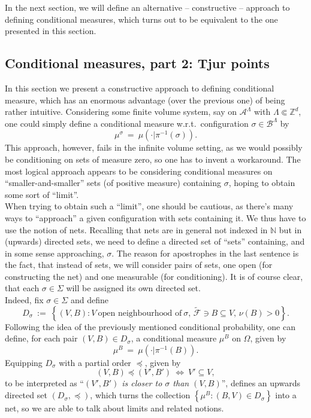 \documentclass[12pt]{article}
\newcommand{\A}{\mathcal{A}}
\newcommand{\B}{\mathcal{B}}
\newcommand{\F}{\mathcal{F}}
\newcommand{\N}{\mathbb{N}}
\newcommand{\Z}{\mathbb{Z}}
\newcommand{\set}[1]{\left\{#1\right\}}
\newcommand{\pika}{\boldsymbol{\cdot}}
\newcommand{\1}{\mathbbm{1}}
\newcommand{\5}{\vspace{0.5cm}}
\renewcommand{\tilde}{\widetilde}
\theoremstyle{definition}
\begin{document}
In the next section, we will define an alternative -- constructive -- approach to defining conditional measures, which turns out to be equivalent to the one presented in this section.


\subsection{Conditional measures, part 2: Tjur points}

In this section we present a constructive approach to defining conditional measure, which has an enormous advantage (over the previous one) of being rather intuitive. Considering some finite volume system, say on $\A^\Lambda$ with $\Lambda\Subset\Z^d$, one could simply define a conditional measure w.r.t.~configuration $\sigma\in\B^\Lambda$ by
$$\mu^\sigma ~=~ \mu(\pika|\pi^{-1}(\sigma)).$$
This approach, however, fails in the infinite volume setting, as we would possibly be conditioning on sets of measure zero, so one has to invent a workaround. The most logical approach appears to be considering conditional measures on ``smaller-and-smaller'' sets (of positive measure) containing $\sigma$, hoping to obtain some sort of ``limit''. \\

When trying to obtain such a ``limit'', one should be cautious, as there's many ways to ``approach'' a given configuration with sets containing it. We thus have to use the notion of nets. Recalling that nets are in general not indexed in $\N$ but in (upwards) directed sets, we need to define a directed set of ``sets'' containing, and in some sense approaching, $\sigma$. The reason for apostrophes in the last sentence is the fact, that instead of sets, we will consider pairs of sets, one open (for constructing the net) and one measurable (for conditioning). It is of course clear, that each $\sigma\in\Sigma$ will be assigned its own directed set.\\

Indeed, fix $\sigma\in\Sigma$ and define
$$D_{\sigma} ~:=~ \set{(V,B):V~\text{open neighbourhood of}~\sigma,\,\tilde{\F}\ni B\subseteq V,\,\nu(B)>0}.$$
Following the idea of the previously mentioned conditional probability, one can define, for each pair $(V,B)\in D_\sigma$, a conditional measure $\mu^B$ on $\Omega$, given by
$$\mu^B ~=~ \mu(\pika|\pi^{-1}(B)).$$	
Equipping $D_\sigma$ with a partial order $\preceq$, given by
$$(V,B)\preceq(V',B') ~\iff~ V'\subseteq V,$$
to be interpreted as ``\textit{$(V',B')$ is closer to $\sigma$ than $(V,B)$}'', defines an upwards directed set $(D_\sigma,\preceq)$, which turns the collection $\set{\mu^B:(B,V)\in D_\sigma}$ into a net, so we are able to talk about limits and related notions. \\
\end{document}
